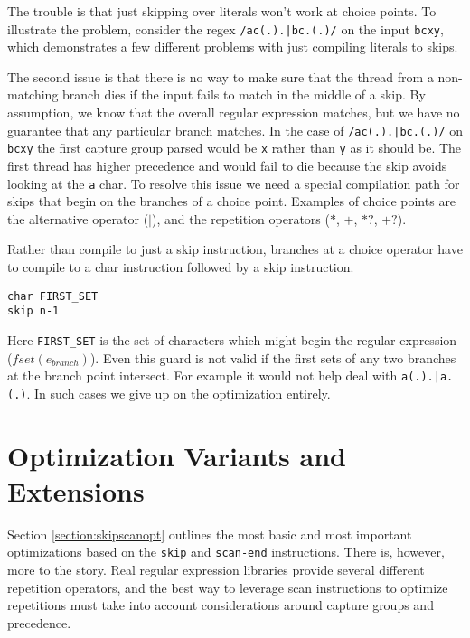\noindent
The trouble is that just skipping over literals won't work at choice points.
To illustrate the problem, consider the regex \verb'/ac(.).|bc.(.)/'
on the input \verb'bcxy', which demonstrates a few different problems with
just compiling literals to skips.


The second issue is that there is no way to make sure that the
thread from a non-matching branch dies if the input fails to match in
the middle of a skip. By assumption, we know that the overall regular
expression matches, but we have no guarantee that any particular branch
matches. In the case of \verb'/ac(.).|bc.(.)/' on \verb'bcxy' the
first capture group parsed would be \verb'x' rather than \verb'y' as
it should be. The first thread has higher precedence and would
fail to die because the skip avoids looking at the \verb'a' char.
To resolve this issue we need a special compilation path for skips
that begin on the branches of a choice point. Examples of
choice points are the alternative operator ($\rvert$),
and the repetition operators ($*$, $+$, $*?$, $+?$).

Rather than compile to just a skip instruction, branches
at a choice operator have to compile to a char instruction
followed by a skip instruction.

\begin{verbatim}
char FIRST_SET
skip n-1
\end{verbatim}

\noindent
Here \verb'FIRST_SET' is the set of characters which might
begin the regular expression ($fset(e_{branch})$).
Even this guard is not valid if the first sets of any two
branches at the branch point intersect. For example it would
not help deal with \verb'a(.).|a.(.)'. In such cases we give up
on the optimization entirely.

\section{Optimization Variants and Extensions}
\label{section:optextend}

Section \ref{section:skipscanopt} outlines the most basic and most
important optimizations based on the \verb'skip' and \verb'scan-end'
instructions. There is, however, more to the story.
Real regular expression libraries provide several different repetition
operators, and the best way to leverage scan instructions to optimize
repetitions must take into account considerations around capture groups and
precedence.

